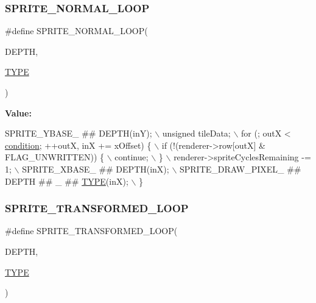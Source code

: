 \subsubsection{\texorpdfstring{S\+P\+R\+I\+T\+E\+\_\+\+N\+O\+R\+M\+A\+L\+\_\+\+L\+O\+OP}{SPRITE\_NORMAL\_LOOP}}
{\footnotesize\ttfamily \#define S\+P\+R\+I\+T\+E\+\_\+\+N\+O\+R\+M\+A\+L\+\_\+\+L\+O\+OP(\begin{DoxyParamCaption}\item[{}]{D\+E\+P\+TH,  }\item[{}]{\mbox{\hyperlink{inflate_8h_a164ea0159d5f0b5f12a646f25f99eceaab47ea8bb955afd0adc0ef98517dd6084}{T\+Y\+PE}} }\end{DoxyParamCaption})}

{\bfseries Value\+:}
\begin{DoxyCode}
SPRITE\_YBASE\_ ## DEPTH(inY); \(\backslash\)
    unsigned tileData; \(\backslash\)
    for (; outX < \mbox{\hyperlink{isa-lr35902_8c_a9cc5e499f71726f3a653debd7bf9ccc7}{condition}}; ++outX, inX += xOffset) \{ \(\backslash\)
        if (!(renderer->row[outX] & FLAG\_UNWRITTEN)) \{ \(\backslash\)
            continue; \(\backslash\)
        \} \(\backslash\)
        renderer->spriteCyclesRemaining -= 1; \(\backslash\)
        SPRITE\_XBASE\_ ## DEPTH(inX); \(\backslash\)
        SPRITE\_DRAW\_PIXEL\_ ## DEPTH ## \_ ## \mbox{\hyperlink{inflate9_8h_a164ea0159d5f0b5f12a646f25f99eceaab47ea8bb955afd0adc0ef98517dd6084}{TYPE}}(inX); \(\backslash\)
    \}
\end{DoxyCode}
\mbox{\label{software-obj_8c_a52211ae275735bbf560e757280a1333a}} 
\subsubsection{\texorpdfstring{S\+P\+R\+I\+T\+E\+\_\+\+T\+R\+A\+N\+S\+F\+O\+R\+M\+E\+D\+\_\+\+L\+O\+OP}{SPRITE\_TRANSFORMED\_LOOP}}
{\footnotesize\ttfamily \#define S\+P\+R\+I\+T\+E\+\_\+\+T\+R\+A\+N\+S\+F\+O\+R\+M\+E\+D\+\_\+\+L\+O\+OP(\begin{DoxyParamCaption}\item[{}]{D\+E\+P\+TH,  }\item[{}]{\mbox{\hyperlink{inflate_8h_a164ea0159d5f0b5f12a646f25f99eceaab47ea8bb955afd0adc0ef98517dd6084}{T\+Y\+PE}} }\end{DoxyParamCaption})}

